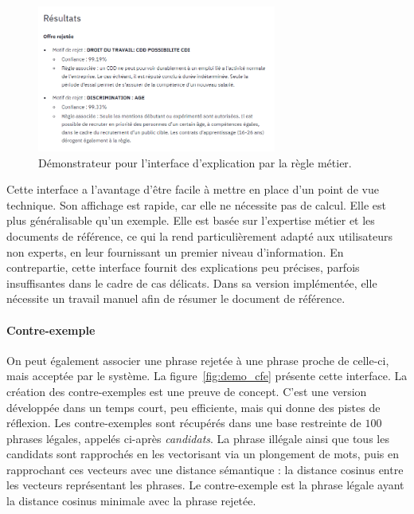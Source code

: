 \begin{figure}[htpb!]
 \centering
 \includegraphics[width=0.7\textwidth]{S2-Explicabilite_locale/figures/demo_regle.png}
 \caption{Démonstrateur pour l'interface d'explication par la règle métier.}
 \label{fig:demo_regle}
\end{figure}

Cette interface a l'avantage d'être facile à mettre en place d'un point de vue technique. Son affichage est rapide, car elle ne nécessite pas de calcul. Elle est plus généralisable qu'un exemple. Elle est basée sur l'expertise métier et les documents de référence, ce qui la rend particulièrement adapté aux utilisateurs non experts, en leur fournissant un premier niveau d'information.
En contrepartie, cette interface fournit des explications peu précises, parfois insuffisantes dans le cadre de cas délicats. Dans sa version implémentée, elle nécessite un travail manuel afin de résumer le document de référence.

\paragraph{Contre-exemple} On peut également associer une phrase rejetée à une phrase proche de celle-ci, mais acceptée par le système. La figure~\ref{fig:demo_cfe} présente cette interface.
La création des contre-exemples est une preuve de concept. C'est une version développée dans un temps court, peu efficiente, mais qui donne des pistes de réflexion. Les contre-exemples sont récupérés dans une base restreinte de $100$ phrases légales, appelés ci-après \textit{candidats}. La phrase illégale ainsi que tous les candidats sont rapprochés en les vectorisant via un plongement de mots, puis en rapprochant ces vecteurs avec une distance sémantique : la distance cosinus entre les vecteurs représentant les phrases. Le contre-exemple est la phrase légale ayant la distance cosinus minimale avec la phrase rejetée.  %

